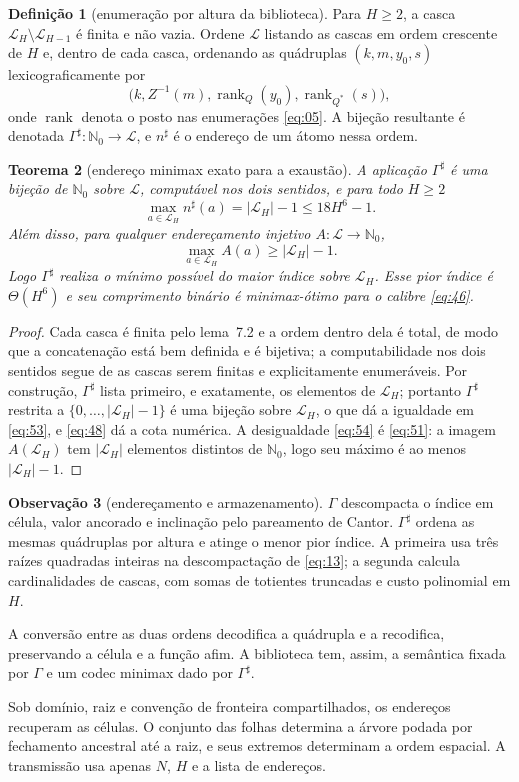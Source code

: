 \documentclass[11pt,a4paper]{article}
\theoremstyle{preciso}
\newtheorem{teorema}{Teorema}[section]
\theoremstyle{definition}
\newtheorem{definicao}[teorema]{Definição}
\newtheorem{observacao}[teorema]{Observação}
\newcommand{\N}{\mathbb N}
\newcommand{\LL}{\mathcal L}
\newcommand{\rank}{\operatorname{rank}}
\newcommand{\eqn}[2]{\begin{equation}\label{eq:#1}#2\end{equation}}
\begin{document}
\begin{definicao}[enumeração por altura da biblioteca]
Para $H\ge2$, a casca $\LL_H\setminus\LL_{H-1}$ é finita e não vazia. Ordene $\LL$ listando as cascas em ordem crescente de $H$ e, dentro de cada casca, ordenando as quádruplas $(k,m,y_0,s)$ lexicograficamente por
\[
\bigl(k,Z^{-1}(m),\rank_Q(y_0),\rank_{Q^*}(s)\bigr),
\]
onde $\rank$ denota o posto nas enumerações \eqref{eq:05}. A bijeção resultante é denotada $\Gamma^\sharp:\N_0\to\LL$, e $n^\sharp$ é o endereço de um átomo nessa ordem.
\end{definicao}

\begin{teorema}[endereço minimax exato para a exaustão]
A aplicação $\Gamma^\sharp$ é uma bijeção de $\N_0$ sobre $\LL$, computável nos dois sentidos, e para todo $H\ge2$
\eqn{53}{\max_{a\in\LL_H}n^\sharp(a)=|\LL_H|-1\le18H^6-1.}
Além disso, para qualquer endereçamento injetivo $A:\LL\to\N_0$,
\eqn{54}{\max_{a\in\LL_H}A(a)\ge|\LL_H|-1.}
Logo $\Gamma^\sharp$ realiza o mínimo possível do maior índice sobre $\LL_H$. Esse pior índice é $\Theta(H^6)$ e seu comprimento binário é minimax-ótimo para o calibre \eqref{eq:46}.
\end{teorema}
\begin{proof}
Cada casca é finita pelo lema~7.2 e a ordem dentro dela é total, de modo que a concatenação está bem definida e é bijetiva; a computabilidade nos dois sentidos segue de as cascas serem finitas e explicitamente enumeráveis. Por construção, $\Gamma^\sharp$ lista primeiro, e exatamente, os elementos de $\LL_H$; portanto $\Gamma^\sharp$ restrita a $\{0,\ldots,|\LL_H|-1\}$ é uma bijeção sobre $\LL_H$, o que dá a igualdade em \eqref{eq:53}, e \eqref{eq:48} dá a cota numérica. A desigualdade \eqref{eq:54} é \eqref{eq:51}: a imagem $A(\LL_H)$ tem $|\LL_H|$ elementos distintos de $\N_0$, logo seu máximo é ao menos $|\LL_H|-1$.
\end{proof}

\begin{observacao}[endereçamento e armazenamento]
$\Gamma$ descompacta o índice em célula, valor ancorado e inclinação pelo pareamento de Cantor. $\Gamma^\sharp$ ordena as mesmas quádruplas por altura e atinge o menor pior índice. A primeira usa três raízes quadradas inteiras na descompactação de \eqref{eq:13}; a segunda calcula cardinalidades de cascas, com somas de totientes truncadas e custo polinomial em $H$.

A conversão entre as duas ordens decodifica a quádrupla e a recodifica, preservando a célula e a função afim. A biblioteca tem, assim, a semântica fixada por $\Gamma$ e um codec minimax dado por $\Gamma^\sharp$.
\end{observacao}
Sob domínio, raiz e convenção de fronteira compartilhados, os endereços recuperam as células. O conjunto das folhas determina a árvore podada por fechamento ancestral até a raiz, e seus extremos determinam a ordem espacial. A transmissão usa apenas $N$, $H$ e a lista de endereços.
\end{document}

